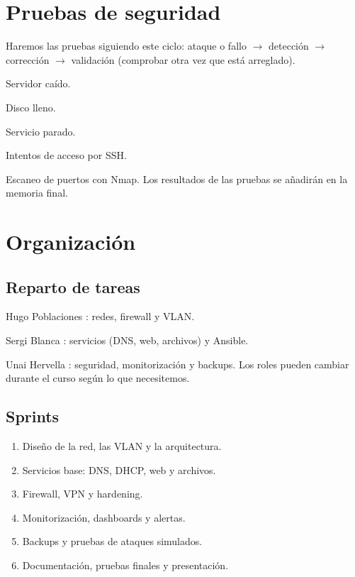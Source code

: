\documentclass[11pt,a4paper]{report}
\begin{document}
\chapter{Pruebas de seguridad}
Haremos las pruebas siguiendo este ciclo: ataque o fallo  $\rightarrow$  detección  $\rightarrow$  corrección  $\rightarrow$  validación (comprobar otra vez que está arreglado). 
\par\noindent\textbullet\quad  Servidor caído. 
\par\noindent\textbullet\quad  Disco lleno. 
\par\noindent\textbullet\quad  Servicio parado. 
\par\noindent\textbullet\quad  Intentos de acceso por SSH. 
\par\noindent\textbullet\quad  Escaneo de puertos con Nmap. Los resultados de las pruebas se añadirán en la memoria final.

\chapter{Organización}

\section{Reparto de tareas}
 
\par\noindent\textbullet\quad  Hugo Poblaciones : redes, firewall y VLAN. 
\par\noindent\textbullet\quad  Sergi Blanca : servicios (DNS, web, archivos) y Ansible. 
\par\noindent\textbullet\quad  Unai Hervella : seguridad, monitorización y backups. Los roles pueden cambiar durante el curso según lo que necesitemos. 
\section{Sprints}
\begin{enumerate}

\item Diseño de la red, las VLAN y la arquitectura.
\item Servicios base: DNS, DHCP, web y archivos.
\item Firewall, VPN y hardening.
\item Monitorización, dashboards y alertas.
\item Backups y pruebas de ataques simulados.
\item Documentación, pruebas finales y presentación.
\end{enumerate}
\end{document}
